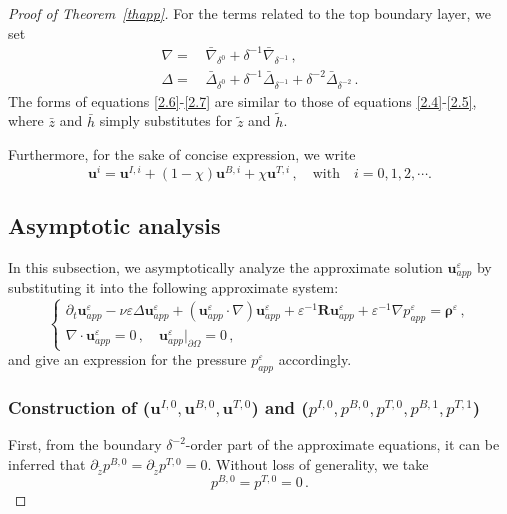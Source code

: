 \documentclass[pdflatex,sn-mathphys-num]{sn-jnl}%
\theoremstyle{thmstyleone}%
\theoremstyle{thmstyletwo}%
\theoremstyle{thmstylethree}%
\theoremstyle{thmstyletwo}
\begin{document}
\begin{proof}[Proof of Theorem~{\upshape\ref{thapp}}]
For the terms related to the top boundary layer, we set 
\begin{align}
	\nabla=\,
	&\bar{\nabla}_{\delta^{0}}
	+\delta^{-1}\bar{\nabla}_{\delta^{-1}}
	\,,\label{2.6}\\
	\Delta=\,
	&\bar{\Delta}_{\delta^{0}}
	+\delta^{-1}\bar{\Delta}_{\delta^{-1}}
	+\delta^{-2}\bar{\Delta}_{\delta^{-2}}
	\,.\label{2.7}
\end{align}
The forms of equations \eqref{2.6}-\eqref{2.7} are similar to those of equations \eqref{2.4}-\eqref{2.5}, where $\bar{z}$ and $\bar{h}$ simply substitutes for $\tilde{z}$ and $\tilde{h}$.


Furthermore, for the sake of concise expression, we write
\begin{equation}\label{2.8}
	\boldsymbol{u}^{i}=
	\boldsymbol u^{I,i}
	+(1-\chi)\boldsymbol u^{B,i}
	+\chi\boldsymbol u^{T,i}\,,\quad\text{with}\quad
	i=0,1,2,\cdots.
\end{equation}





\subsection{Asymptotic analysis}\label{subsec2.2}
In this subsection, we asymptotically analyze the approximate solution $\boldsymbol{u}_{app}^\varepsilon$ by substituting it into the following approximate system:
\begin{equation}\label{2.9}
	\begin{cases}
		\partial_{t} {\boldsymbol u}_{app}^{\varepsilon}-\nu\varepsilon\Delta{\boldsymbol u}_{app}^{\varepsilon}+({\boldsymbol u}_{app}^{\varepsilon} \cdot \nabla) {\boldsymbol u}_{app}^{\varepsilon}+\varepsilon^{-1}\boldsymbol{R} {\boldsymbol u}_{app}^{\varepsilon}
		+\varepsilon^{-1}\nabla{p}_{app}^{\varepsilon}=\boldsymbol \rho^\varepsilon\,,\\
		\nabla\cdot {\boldsymbol u}_{app}^{\varepsilon}=0\,,\quad
		{\boldsymbol u}_{app}^{\varepsilon}|_{\partial\Omega}=0\,,
	\end{cases}
\end{equation}
and give an expression for the pressure ${p}_{app}^\varepsilon$ accordingly.

\subsubsection{Construction of ($\boldsymbol{u}^{I,0}, \boldsymbol{u}^{B,0}, \boldsymbol{u}^{T,0}$)  and (${p}^{I,0}, {p}^{B,0}, {p}^{T,0},{p}^{B,1},{p}^{T,1}$)}\label{subsec2.2.1}
First, from the boundary $\delta^{-2}$-order part of the approximate equations, it can be inferred that $\partial_{\tilde{z}}p^{B,0}=\partial_{\tilde{z}}p^{T,0}=0$.  Without loss of generality, we take 
\begin{equation}\label{2.10}
	p^{B,0}=p^{T,0}=0\,.
\end{equation}


\end{proof}
\end{document}

